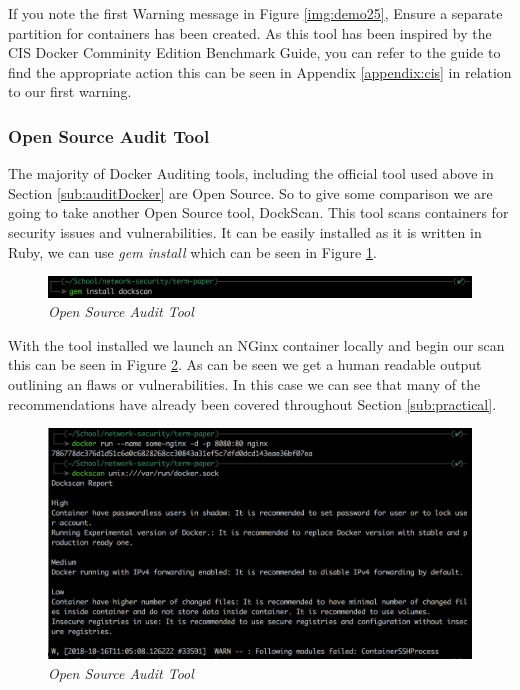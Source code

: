 If you note the first Warning message in Figure \ref{img:demo25}, Ensure a separate partition for containers has been created. As this tool has been inspired by the CIS Docker Comminity Edition Benchmark Guide, you can refer to the guide to find the appropriate action this can be seen in Appendix \ref{appendix:cis} in relation to our first warning.
\newpage
\subsubsection{Open Source Audit Tool}
\label{sub:auditSource}
The majority of Docker Auditing tools, including the official tool used above in Section \ref{sub:auditDocker} are Open Source. So to give some comparison we are going to take another Open Source tool, DockScan. This tool scans containers for security issues and vulnerabilities. It can be easily installed as it is written in Ruby, we can use \textit{gem install} which can be seen in Figure \ref{img:demo28}.
\begin{figure}[!ht]
\centering
\includegraphics*[width=\textwidth]{images/term28.png}
\caption{\em Open Source Audit Tool}
\label{img:demo28}
\end{figure}

With the tool installed we launch an NGinx container locally and begin our scan this can be seen in Figure \ref{img:demo26}. As can be seen we get a human readable output outlining an flaws or vulnerabilities. In this case we can see that many of the recommendations have already been covered throughout Section \ref{sub:practical}.
\begin{figure}[!ht]
\centering
\includegraphics*[width=\textwidth]{images/term26.png}
\caption{\em Open Source Audit Tool}
\label{img:demo26}
\end{figure}
\newpage
